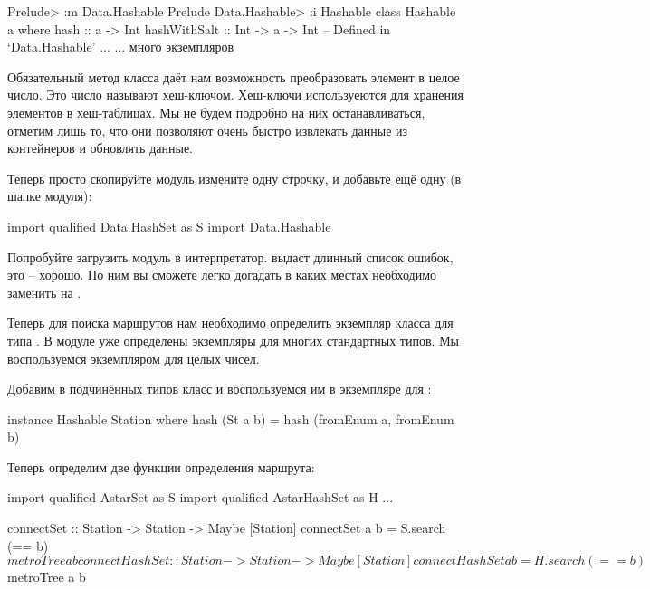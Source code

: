 \begin{code}
Prelude> :m Data.Hashable
Prelude Data.Hashable> :i Hashable
class Hashable a where
  hash :: a -> Int
  hashWithSalt :: Int -> a -> Int
  	-- Defined in `Data.Hashable'
...
... много экземпляров
\end{code}

Обязательный метод класса  даёт нам возможность преобразовать
элемент в целое число. Это число называют хеш-ключом. Хеш-ключи
используеются для хранения элементов в хеш-таблицах. Мы не будем
подробно на них останавливаться, отметим лишь то, что они позволяют
очень быстро извлекать данные из контейнеров и обновлять данные.

Теперь просто скопируйте модуль  измените одну строчку, и
добавьте ещё одну (в шапке модуля):


\begin{code}
import qualified Data.HashSet as S
import Data.Hashable
\end{code}

Попробуйте загрузить модуль в интерпретатор.  выдаст длинный
список ошибок, это -- хорошо. По ним вы сможете легко догадать в каких
местах необходимо заменить  на .

Теперь для поиска маршрутов нам необходимо определить экземпляр класса
 для типа . В модуле  уже
определены экземпляры для многих стандартных типов. Мы воспользуемся
экземпляром для целых чисел.

Добавим в  подчинённых типов класс  и воспользуемся
им в экземпляре для :


\begin{code}
instance Hashable Station where
    hash (St a b) = hash (fromEnum a, fromEnum b)
\end{code}

Теперь определим две функции определения маршрута:


\begin{code}
import qualified AstarSet       as S
import qualified AstarHashSet   as H
...

connectSet :: Station -> Station -> Maybe [Station]
connectSet a b = S.search (== b) $ metroTree a b

connectHashSet :: Station -> Station -> Maybe [Station]
connectHashSet a b = H.search (== b) $ metroTree a b
\end{code}

